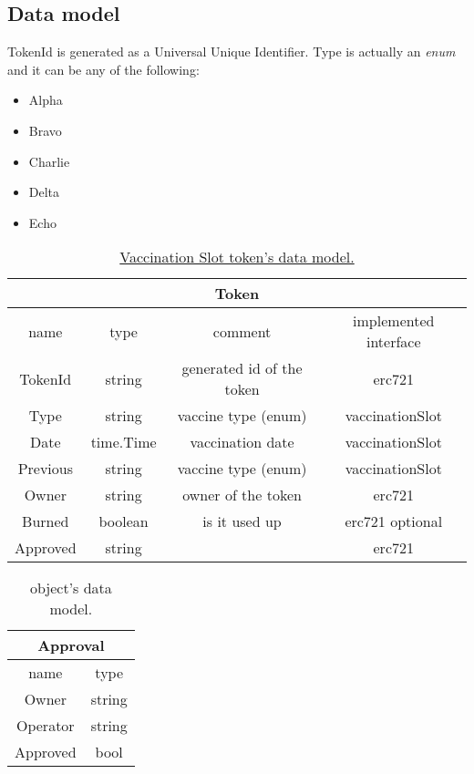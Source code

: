 \subsection{Data model}
TokenId is generated as a Universal Unique Identifier. Type is actually an \emph{enum} and it can be any of the following:
\begin{itemize}
  \item Alpha
  \item Bravo
  \item Charlie
  \item Delta
  \item Echo
\end{itemize}

\begin{center}
  \begin{table}[!ht]
    \centering
    \begin{tabular}{|c | c | c | c |}
      \hline
      \multicolumn{4}{|c|}{Token}                                              \\
      \hline
      name     & type      & comment                   & implemented interface \\
      \hline
      TokenId  & string    & generated id of the token & erc721                \\
      Type     & string    & vaccine type (enum)       & vaccinationSlot       \\
      Date     & time.Time & vaccination date          & vaccinationSlot       \\
      Previous & string    & vaccine type (enum)       & vaccinationSlot       \\
      Owner    & string    & owner of the token        & erc721                \\
      Burned   & boolean   & is it used up             & erc721 optional       \\
      Approved & string    &                           & erc721                \\
      \hline
    \end{tabular}
    \caption{\href{https://pkg.go.dev/github.com/perryd01/vaccination-slot/chaincode\#VaccinationSlot}{Vaccination Slot token's data model.}}
  \end{table}
\end{center}


\begin{center}
  \begin{table}[!ht]
    \centering
    \begin{tabular}{| c | c |}
      \hline
      \multicolumn{2}{|c|}{Approval} \\
      \hline
      name     & type                \\
      \hline
      Owner    & string              \\
      Operator & string              \\
      Approved & bool                \\
      \hline
    \end{tabular}
    \caption{ object's data model.}
  \end{table}
\end{center}

